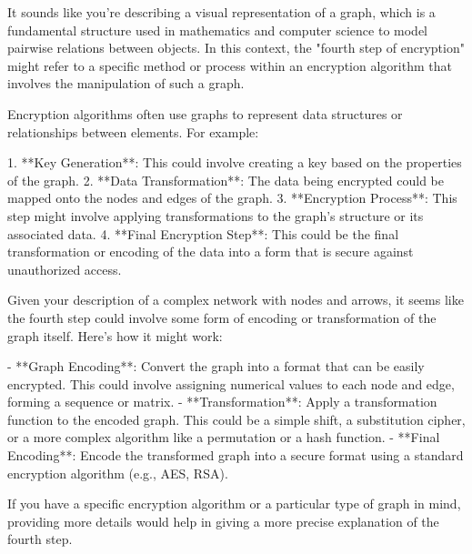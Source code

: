 It sounds like you're describing a visual representation of a graph, which is a fundamental structure used in mathematics and computer science to model pairwise relations between objects. In this context, the "fourth step of encryption" might refer to a specific method or process within an encryption algorithm that involves the manipulation of such a graph.

Encryption algorithms often use graphs to represent data structures or relationships between elements. For example:

1. **Key Generation**: This could involve creating a key based on the properties of the graph.
2. **Data Transformation**: The data being encrypted could be mapped onto the nodes and edges of the graph.
3. **Encryption Process**: This step might involve applying transformations to the graph's structure or its associated data.
4. **Final Encryption Step**: This could be the final transformation or encoding of the data into a form that is secure against unauthorized access.

Given your description of a complex network with nodes and arrows, it seems like the fourth step could involve some form of encoding or transformation of the graph itself. Here’s how it might work:

- **Graph Encoding**: Convert the graph into a format that can be easily encrypted. This could involve assigning numerical values to each node and edge, forming a sequence or matrix.
- **Transformation**: Apply a transformation function to the encoded graph. This could be a simple shift, a substitution cipher, or a more complex algorithm like a permutation or a hash function.
- **Final Encoding**: Encode the transformed graph into a secure format using a standard encryption algorithm (e.g., AES, RSA).

If you have a specific encryption algorithm or a particular type of graph in mind, providing more details would help in giving a more precise explanation of the fourth step.